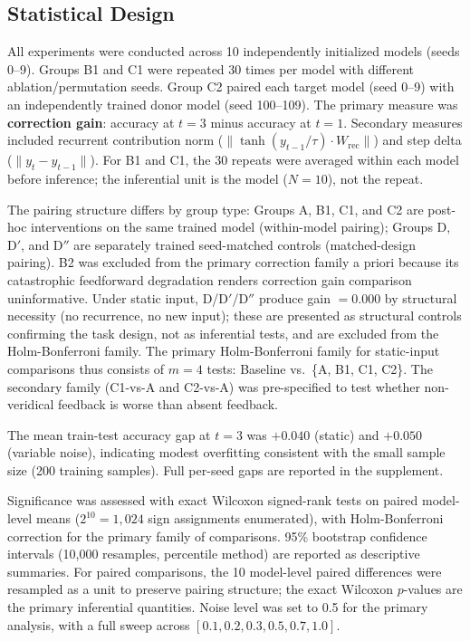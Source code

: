 \documentclass[10pt]{article}
\begin{document}
\subsection{Statistical Design}

All experiments were conducted across 10 independently initialized models (seeds 0--9). Groups B1 and C1 were repeated 30 times per model with different ablation/permutation seeds. Group C2 paired each target model (seed 0--9) with an independently trained donor model (seed 100--109). The primary measure was \textbf{correction gain}: accuracy at $t{=}3$ minus accuracy at $t{=}1$. Secondary measures included recurrent contribution norm ($\|\tanh(y_{t-1}/\tau) \cdot W_\text{rec}\|$) and step delta ($\|y_t - y_{t-1}\|$). For B1 and C1, the 30 repeats were averaged within each model before inference; the inferential unit is the model ($N{=}10$), not the repeat.

The pairing structure differs by group type: Groups A, B1, C1, and C2 are post-hoc interventions on the same trained model (within-model pairing); Groups D, D$'$, and D$''$ are separately trained seed-matched controls (matched-design pairing). B2 was excluded from the primary correction family a priori because its catastrophic feedforward degradation renders correction gain comparison uninformative. Under static input, D/D$'$/D$''$ produce gain $= 0.000$ by structural necessity (no recurrence, no new input); these are presented as structural controls confirming the task design, not as inferential tests, and are excluded from the Holm-Bonferroni family. The primary Holm-Bonferroni family for static-input comparisons thus consists of $m = 4$ tests: Baseline vs.\ \{A, B1, C1, C2\}. The secondary family (C1-vs-A and C2-vs-A) was pre-specified to test whether non-veridical feedback is worse than absent feedback.

The mean train-test accuracy gap at $t{=}3$ was $+0.040$ (static) and $+0.050$ (variable noise), indicating modest overfitting consistent with the small sample size (200 training samples). Full per-seed gaps are reported in the supplement.

Significance was assessed with exact Wilcoxon signed-rank tests on paired model-level means ($2^{10} = 1{,}024$ sign assignments enumerated), with Holm-Bonferroni correction for the primary family of comparisons. 95\% bootstrap confidence intervals (10,000 resamples, percentile method) are reported as descriptive summaries. For paired comparisons, the 10 model-level paired differences were resampled as a unit to preserve pairing structure; the exact Wilcoxon $p$-values are the primary inferential quantities. Noise level was set to 0.5 for the primary analysis, with a full sweep across $[0.1, 0.2, 0.3, 0.5, 0.7, 1.0]$.
\end{document}
